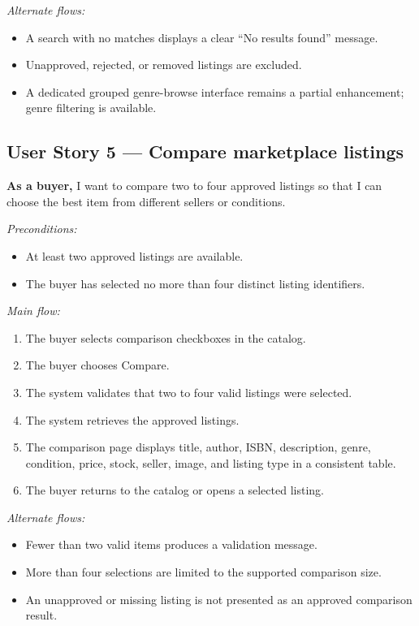 \documentclass[11pt]{scrreprt}
\begin{document}
\textit{Alternate flows:}
\begin{itemize}
\item A search with no matches displays a clear ``No results found'' message.
\item Unapproved, rejected, or removed listings are excluded.
\item A dedicated grouped genre-browse interface remains a partial enhancement;
genre filtering is available.
\end{itemize}

\subsection{User Story 5 --- Compare marketplace listings}
\textbf{As a buyer,} I want to compare two to four approved listings so that I
can choose the best item from different sellers or conditions.

\textit{Preconditions:}
\begin{itemize}
\item At least two approved listings are available.
\item The buyer has selected no more than four distinct listing identifiers.
\end{itemize}

\textit{Main flow:}
\begin{enumerate}
\item The buyer selects comparison checkboxes in the catalog.
\item The buyer chooses Compare.
\item The system validates that two to four valid listings were selected.
\item The system retrieves the approved listings.
\item The comparison page displays title, author, ISBN, description, genre,
condition, price, stock, seller, image, and listing type in a consistent table.
\item The buyer returns to the catalog or opens a selected listing.
\end{enumerate}

\textit{Alternate flows:}
\begin{itemize}
\item Fewer than two valid items produces a validation message.
\item More than four selections are limited to the supported comparison size.
\item An unapproved or missing listing is not presented as an approved
comparison result.
\end{itemize}
\end{document}
